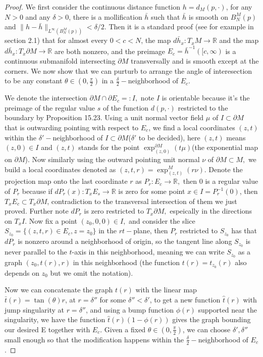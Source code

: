 \documentclass[12pt]{amsart}
\newcommand{\R}{\mathbb R}
\newcommand{\p}{\partial}
\numberwithin{equation}{section}
\begin{document}
	\begin{proof}
		We first consider the continuous distance function $h=d_M(p,\cdot)$, for any $N>0$ and any $\delta >0$, there is a mollification $\bar{h}$ such that $\bar{h}$ is smooth on $B^M_N(p)$ and $\|h-\bar{h}\|_{L^{\infty}(B^M_N(p))}<\delta/2$. Then it is a standard proof (see for example in \cite{GuillPolla1974-DifferentialTopology} section 2.1) that for almost every $0<c<N$, the map $d\bar{h}_x: T_xM \rightarrow \R$ and the map $d\bar{h}_x:T_x \p M \rightarrow \R$ are both nonzero, and the preimage $E_c=\bar{h}^{-1}([c,\infty)$ is a continuous submanifold intersecting $\p M$ transversally and is smooth except at the corners. We now show that we can purturb to arrange the angle of interesection to be any constant $\theta\in (0,\frac{\pi}{2})$ in a $\frac{\delta}{2}-$neighborhood of $E_c$.

		We denote the intersection $\partial M \cap \partial E_c=:I,$ note $I$ is orientable because it's the preimage of the regular value $s$ of the function $d(p,\cdot)$ restricted to the boundary by \cite{Lee2012-IntroductionSmoothManifoldsa} Proposition 15.23.
		Using a unit normal vector field $\mu$ of $I\subset \partial M$ that is outwarding pointing with respect to $E_c$, we find a local coordinates $(z,t)$ within the $\delta'-$neighborhood of $I \subset \partial M$($\delta'$ to be decided), here $(z,t)$ means $(z,0)\in I$ and $(z,t)$ stands for the point $\exp^{\p M}_{(z,0)}(t \mu)$(the exponential map on $\p M$). Now similarly using the outward pointing unit normal $\nu$ of $\partial M \subset M,$ we build a local coordinates denoted as $(z,t,r)=\exp^M_{(z,t)}(r\nu)$. Denote the projection map  onto the last coordinate $r$ as $P_r:E_c\rightarrow \R,$ then $0$ is a regular value of $P_r$ because if $dP_r(x): T_xE_s \rightarrow \R$ is zero for some point $x\in I=P_r^{-1}(0)$, then $T_x E_c \subset T_x \partial M$, contradiction to the transversal intersection of them we just proved. Further note $dP_r$ is zero restricted to $T_x \partial M,$ espeically in the directions on $T_x I.$ Now fix a point $(z_0,0,0) \in I,$ and consider the slice $S_{z_0}=\{(z,t,r)\in E_c,z=z_0\}$ in the $rt-$plane, then $P_r$ restricted to $S_{z_0}$ has that $dP_r$ is nonzero around a neighborhood of origin, so the tangent line along $S_{z_0}$ is never parallel to the $t$-axis in this neighborhood, meaning we can write $S_{z_0}$ as a graph $(z_0,t(r),r)$ in this neighborhood (the function $t(r)=t_{z_0}(r)$ also depends on $z_0$ but we omit the notation). 

		Now we can concatenate the graph $t(r)$ with the linear map $\bar{t}(r)=\tan(\theta) r$, at $r=\delta''$ for some $\delta''<\delta'$, to get a new function $\hat{t}(r)$ with jump singularity at $r=\delta''$, and using a bump function $\phi(r)$ supported near the singularity, we have the function $\hat{t}(r)(1-\phi(r))$  gives the graph bounding our desired E together with $E_c$. Given a fixed $\theta \in (0,\frac{\pi}{2})$, we can choose $\delta',\delta''$ small enough so that the modification happens within the $\frac{\delta}{2}-$neighborhood of $E_c$.
	\end{proof}
\end{document}
